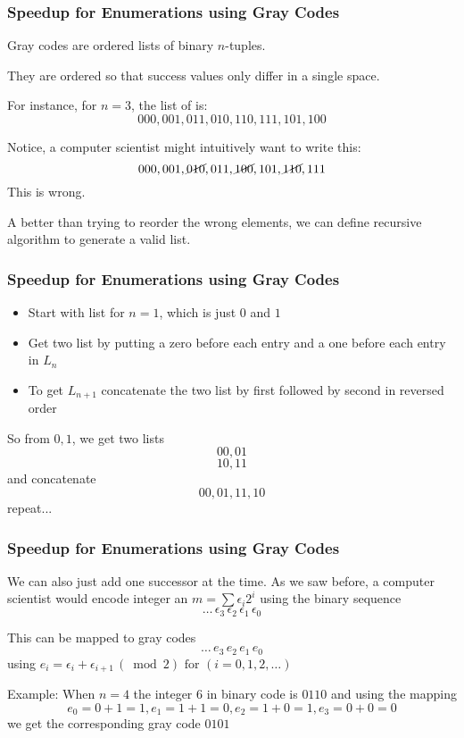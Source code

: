 \documentclass[10pt]{beamer}
\begin{document}
\begin{frame}
\frametitle{Speedup for Enumerations using Gray Codes}

Gray codes are ordered lists of binary $n$-tuples. \newline

They are ordered so that success values only differ in a single space.

For instance, for $n = 3$, the list of is:
\[ 000, 001, 011, 010, 110, 111, 101, 100 \]

Notice, a computer scientist might intuitively want to write this:
\[ 000, 001, \cancel{010}, 011, \cancel{100}, 101, \cancel{110}, 111 \]
This is wrong. \newline

A better than trying to reorder the wrong elements, we can define recursive algorithm to generate a valid list.

\end{frame}

\begin{frame}
\frametitle{Speedup for Enumerations using Gray Codes}

\begin{itemize}
\item Start with list for $n = 1$, which is just $0$ and $1$ 
\item Get two list by putting a zero before each entry and a one before each entry in $L_n$ 
\item To get $L_{n+1}$ concatenate the two list by first followed by second in reversed order 
\end{itemize}

\vspace{0.3cm}
So from $0,1$, we get two lists
\[ 00, 01 \]
\[ 10, 11 \]
and concatenate
\[  00, 01, 11, 10 \]
repeat...

\end{frame}

\begin{frame}
\frametitle{Speedup for Enumerations using Gray Codes}

We can also just add one successor at the time. 
As we saw before, a computer scientist would encode integer an $m = \sum \epsilon_i 2^i$
using the binary sequence 
\[ \dots \, \epsilon_3 \, \epsilon_2 \, \epsilon_1 \, \epsilon_0 \]

This can be mapped to gray codes 
\[ \dots \, e_3 \, e_2 \, e_1 \, e_0 \]
using $e_i = \epsilon_i + \epsilon_{i+1} \, (\bmod 2) \text{ for } (i = 0,1,2,\dots)$ \newline

Example: 
When $n = 4$ the integer $6$ in binary code is $0110$ and using the mapping 
\[ e_0 = 0 + 1 = 1, e_1 = 1 + 1 = 0, e_2 = 1 + 0 = 1, e_3 = 0 + 0 = 0 \]
we get the corresponding gray code $0101$

\end{frame}
\end{document}
